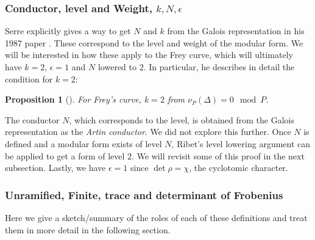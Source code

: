 \documentclass{article}
\newtheorem{proposition}{Proposition}[section]
\theoremstyle{definition}
\theoremstyle{definition}
\theoremstyle{definition}
\begin{document}


\subsubsection{Conductor, level and Weight, $k, N, \epsilon$}

Serre explicitly gives a way to get $N$ and $k$ from the Galois representation in his 1987 paper \cite{Serre}. These correspond to the level and weight of the modular form. We will be interested in how these apply to the Frey curve, which will ultimately have $k=2$, $\epsilon=1$ and $N$ lowered to $2$. In particular, he describes in detail the condition for $k=2$:



\begin{proposition}[\cite{Serre}]
    For Frey's curve, $k=2$ from $\nu_P(\Delta)=0\mod P$.
\end{proposition}


The conductor $N$, which corresponds to the level, is obtained from the Galois representation as the \emph{Artin conductor}. We did not explore this further.
\newline\newline
Once $N$ is defined and a modular form exists of level $N$, Ribet's level lowering argument can be applied to get a form of level $2$.
\newline\newline
We will revisit some of this proof in the next subsection.
\newline\newline
Lastly, we have $\epsilon= 1$ since $\det\rho=\chi$, the cyclotomic character.


\subsubsection{Unramified, Finite, trace and determinant of Frobenius}

Here we give a sketch/summary of the roles of each of these definitions and treat them in more detail in the following section.
\end{document}
